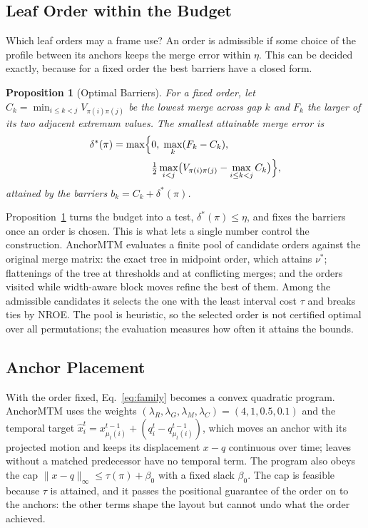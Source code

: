 \documentclass[preprint]{vgtc}   %
\newtheorem{proposition}{Proposition}
\begin{document}
\subsection{Leaf Order within the Budget}
Which leaf orders may a frame use? An order is admissible if some choice of the profile between its anchors keeps the merge error within $\eta$. This can be decided exactly, because for a fixed order the best barriers have a closed form.
\begin{proposition}[Optimal Barriers]\label{prop:barriers}
For a fixed order, let $C_k=\min_{i\le k<j}V_{\pi(i)\pi(j)}$ be the lowest merge across gap $k$ and $F_k$ the larger of its two adjacent extremum values. The smallest attainable merge error is
\begin{equation}\label{eq:delta}
 \begin{split}
 \delta^*(\pi)=\max\Bigl\{&0,\;\max_k(F_k-C_k),\\
 &\tfrac12\max_{i<j}\bigl(V_{\pi(i)\pi(j)}-\max_{i\le k<j}C_k\bigr)\Bigr\},
 \end{split}
\end{equation}
attained by the barriers $b_k=C_k+\delta^*(\pi)$.
\end{proposition}
Proposition~\ref{prop:barriers} turns the budget into a test, $\delta^*(\pi)\le\eta$, and fixes the barriers once an order is chosen. This is what lets a single number control the construction. AnchorMTM evaluates a finite pool of candidate orders against the original merge matrix: the exact tree in midpoint order, which attains $\nu^*$; flattenings of the tree at thresholds and at conflicting merges; and the orders visited while width-aware block moves refine the best of them. Among the admissible candidates it selects the one with the least interval cost $\tau$ and breaks ties by NROE. The pool is heuristic, so the selected order is not certified optimal over all permutations; the evaluation measures how often it attains the bounds.

\subsection{Anchor Placement}
With the order fixed, Eq.~\ref{eq:family} becomes a convex quadratic program. AnchorMTM uses the weights $(\lambda_R,\lambda_G,\lambda_M,\lambda_C)=(4,1,0.5,0.1)$ and the temporal target $\hat x_i^t=x_{\mu_t(i)}^{t-1}+(q_i^t-q_{\mu_t(i)}^{t-1})$, which moves an anchor with its projected motion and keeps its displacement $x-q$ continuous over time; leaves without a matched predecessor have no temporal term. The program also obeys the cap $\|x-q\|_\infty\le\tau(\pi)+\beta_0$ with a fixed slack $\beta_0$. The cap is feasible because $\tau$ is attained, and it passes the positional guarantee of the order on to the anchors: the other terms shape the layout but cannot undo what the order achieved.
\end{document}
